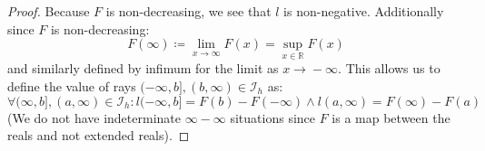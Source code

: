 \documentclass[10pt,letterpaper]{article} %
\begin{document}
\begin{proof}
Because $F$ is non-decreasing, we see that $l$ is non-negative. Additionally since $F$ is non-decreasing:
\begin{equation*}
F(\infty) \coloneq \lim_{x \xrightarrow{} \infty}F(x) = \sup_{x \in \mathbb{R}}F(x)
\end{equation*}
and similarly defined by infimum for the limit as $x \xrightarrow{} - \infty$. This allows us to define the value of rays $(-\infty, b], (b, \infty) \in \mathcal{I}_h$ as:
\begin{equation*}
\forall (\infty, b], (a, \infty) \in \mathcal{I}_h: l(-\infty, b] = F(b) - F(-\infty) \land l(a, \infty) = F(\infty) - F(a)
\end{equation*}
(We do not have indeterminate $\infty - \infty$ situations since $F$ is a map between the reals and not extended reals).


\end{proof}
\end{document}
